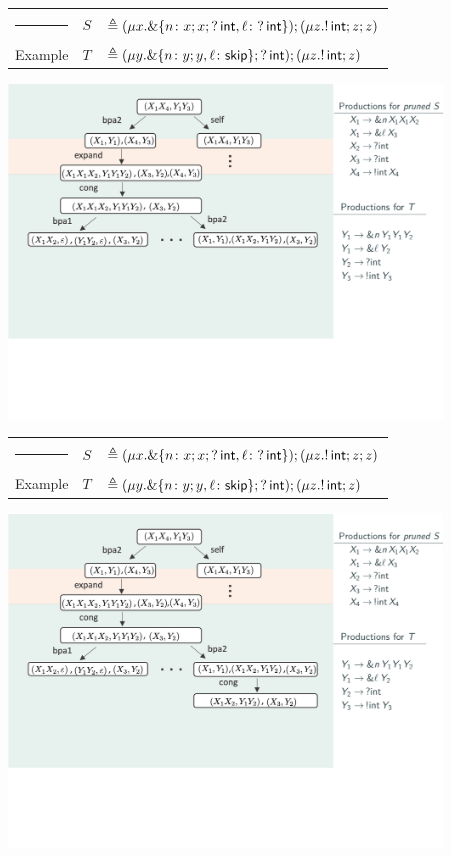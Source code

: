 \documentclass[10pt]{beamer}
\begin{document}
\begin{frame}
	\begin{tabular} {l l l }
  		{\color{teal}\rule{3cm}{2pt}} &  $S$ &$\triangleq (\mu x. \&\{n\colon x;x;?\,\mathsf{int},
      \ell\colon ?\,\mathsf{int} \});( \mu z. !\,\mathsf{int}; z;z )$\\
  		{\color{teal} Example}  &  $T$ &$\triangleq (\mu y. \&\{n\colon y;y,
      \ell\colon \mathsf{skip} \}; ?\,\mathsf{int}); (\mu z. !\,\mathsf{int}; z)$
	\end{tabular}
	\vspace*{2mm}
	\includegraphics[width=11.5cm]{img/exemplo-5}\smallskip
\end{frame}

\begin{frame}
	\begin{tabular} {l l l }
  		{\color{teal}\rule{3cm}{2pt}} &  $S$ &$\triangleq (\mu x. \&\{n\colon x;x;?\,\mathsf{int},
      \ell\colon ?\,\mathsf{int} \});( \mu z. !\,\mathsf{int}; z;z )$\\
  		{\color{teal} Example}  &  $T$ &$\triangleq (\mu y. \&\{n\colon y;y,
      \ell\colon \mathsf{skip} \}; ?\,\mathsf{int}); (\mu z. !\,\mathsf{int}; z)$
	\end{tabular}
	\vspace*{2mm}
	\includegraphics[width=11.5cm]{img/exemplo-4}\smallskip
\end{frame}
\end{document}
